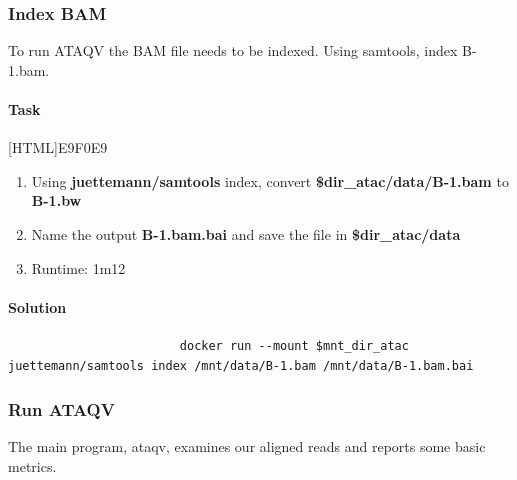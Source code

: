 \documentclass[12pt]{article}
\begin{document}
		\subsubsection{Index BAM}
			To run ATAQV the BAM file needs to be indexed. 
			Using samtools, index B-1.bam.
			
			\paragraph{Task}
			
				[HTML]{E9F0E9}{\parbox{\linewidth}{%
						\begin{enumerate}
							\item  Using \textbf{ juettemann/samtools} index, convert \textbf{\$dir\_atac/data/B-1.bam} to \textbf{B-1.bw}
							\item  Name the output \textbf{B-1.bam.bai} and save the file in \textbf{\$dir\_atac/data}
							\item Runtime: 1m12
						\end{enumerate}
				}}
			
			\paragraph{Solution}
				\begin{minipage}{\linewidth}
					\begin{lstlisting}
						docker run --mount $mnt_dir_atac juettemann/samtools index /mnt/data/B-1.bam /mnt/data/B-1.bam.bai
					\end{lstlisting}
				\end{minipage}
		
		\subsubsection{Run ATAQV}
			The main program, ataqv, examines our aligned reads and reports some basic metrics.
			
\end{document}
